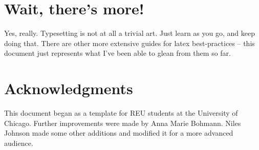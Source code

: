 \documentclass[11pt,oneside,draft]{amsart}
\begin{document}
\section{Wait, there's more!}

Yes, really.  Typesetting is not at all a trivial art.  Just learn as
you go, and keep doing that.  There are other more extensive guides
for latex best-practices -- this document just represents what I've
been able to glean from them so far.

\section*{Acknowledgments}  

This document began as a template for REU students at the University
of Chicago.  Further improvements were made by Anna Marie Bohmann.
Niles Johnson made some other additions and modified it for a more
advanced audience.


%
\end{document}
